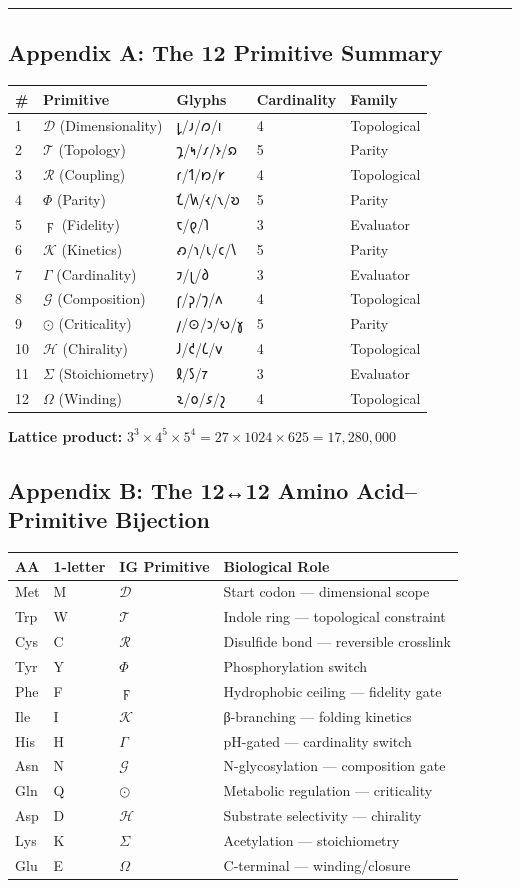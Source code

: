 \begin{center}\rule{0.5\linewidth}{0.5pt}\end{center}

\hypertarget{appendix-a-the-12-primitive-summary}{%
\subsection{Appendix A: The 12 Primitive
Summary}\label{appendix-a-the-12-primitive-summary}}

\begin{longtable}[]{@{}lllll@{}}
\toprule
\# & Primitive & Glyphs & Cardinality & Family\tabularnewline
\midrule
\endhead
1 & \(\mathcal{D}\) (Dimensionality) & 𐑛/𐑨/𐑼/𐑦 & 4 &
Topological\tabularnewline
2 & \(\mathcal{T}\) (Topology) & 𐑡/𐑰/𐑥/𐑶/𐑸 & 5 & Parity\tabularnewline
3 & \(\mathcal{R}\) (Coupling) & 𐑩/𐑑/𐑽/𐑾 & 4 &
Topological\tabularnewline
4 & \(\Phi\) (Parity) & 𐑗/𐑿/𐑬/𐑯/𐑹 & 5 & Parity\tabularnewline
5 & \(\digamma\) (Fidelity) & 𐑱/𐑞/𐑐 & 3 & Evaluator\tabularnewline
6 & \(\mathcal{K}\) (Kinetics) & 𐑺/𐑪/𐑧/𐑤/𐑘 & 5 & Parity\tabularnewline
7 & \(\Gamma\) (Cardinality) & 𐑲/𐑚/𐑔 & 3 & Evaluator\tabularnewline
8 & \(\mathcal{G}\) (Composition) & 𐑝/𐑜/𐑠/𐑵 & 4 &
Topological\tabularnewline
9 & \(\odot\) (Criticality) & 𐑢/⊙/𐑮/𐑻/𐑣 & 5 & Parity\tabularnewline
10 & \(\mathcal{H}\) (Chirality) & 𐑓/𐑒/𐑖/𐑫 & 4 &
Topological\tabularnewline
11 & \(\Sigma\) (Stoichiometry) & 𐑙/𐑕/𐑳 & 3 & Evaluator\tabularnewline
12 & \(\Omega\) (Winding) & 𐑷/𐑴/𐑭/𐑟 & 4 & Topological\tabularnewline
\bottomrule
\end{longtable}

\textbf{Lattice product:}
\(3^3 \times 4^5 \times 5^4 = 27 \times 1024 \times 625 = 17,280,000\)

\hypertarget{appendix-b-the-1212-amino-acidprimitive-bijection}{%
\subsection{Appendix B: The 12↔12 Amino Acid--Primitive
Bijection}\label{appendix-b-the-1212-amino-acidprimitive-bijection}}

\begin{longtable}[]{@{}llll@{}}
\toprule
AA & 1-letter & IG Primitive & Biological Role\tabularnewline
\midrule
\endhead
Met & M & \(\mathcal{D}\) & Start codon --- dimensional
scope\tabularnewline
Trp & W & \(\mathcal{T}\) & Indole ring --- topological
constraint\tabularnewline
Cys & C & \(\mathcal{R}\) & Disulfide bond --- reversible
crosslink\tabularnewline
Tyr & Y & \(\Phi\) & Phosphorylation switch\tabularnewline
Phe & F & \(\digamma\) & Hydrophobic ceiling --- fidelity
gate\tabularnewline
Ile & I & \(\mathcal{K}\) & β-branching --- folding
kinetics\tabularnewline
His & H & \(\Gamma\) & pH-gated --- cardinality switch\tabularnewline
Asn & N & \(\mathcal{G}\) & N-glycosylation --- composition
gate\tabularnewline
Gln & Q & \(\odot\) & Metabolic regulation ---
criticality\tabularnewline
Asp & D & \(\mathcal{H}\) & Substrate selectivity ---
chirality\tabularnewline
Lys & K & \(\Sigma\) & Acetylation --- stoichiometry\tabularnewline
Glu & E & \(\Omega\) & C-terminal --- winding/closure\tabularnewline
\bottomrule
\end{longtable}

